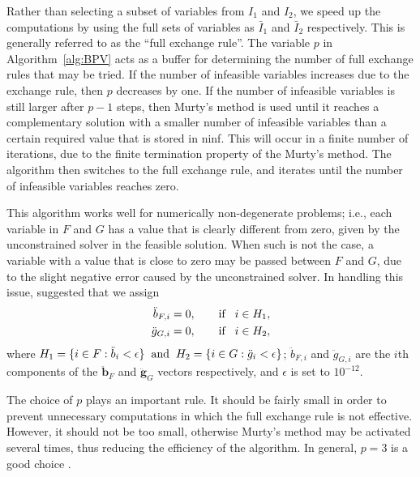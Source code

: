 \documentclass[11pt]{article}
\newcommand{\0}{\phantom{0}}
\begin{document}
Rather than selecting a subset of variables from $I_{1}$ and $I_{2}$, we speed up the computations by using the full sets of variables as $\bar{I}_{1}$ and $\bar{I}_{2}$ respectively. This is generally referred to as the ``full exchange rule''. The variable $p$ in Algorithm~\ref{alg:BPV} acts as a buffer for determining the number of full exchange rules that may be tried. If the number of infeasible variables increases due to the exchange rule, then $p$ decreases by one. If the number of infeasible variables is still larger after $p - 1$ steps, then Murty's method is used until it reaches a complementary solution with a smaller number of infeasible variables than a certain required value that is stored in ninf. This will occur in a finite number of iterations, due to the finite termination property of the Murty's method. The algorithm then switches to the full exchange rule, and iterates until the number of infeasible variables reaches zero.

This algorithm works well for numerically non-degenerate problems; i.e., each variable in $F$ and $G$ has a value that is clearly different from zero, given by the unconstrained solver in the feasible solution. When such is not the case, a variable with a value that is close to zero may be passed between $F$ and $G$, due to the slight negative error caused by the unconstrained solver. In handling this issue, \citet{Cantar2004} suggested that we assign
\begin{align*}
\ddot{b}_{F, i} & = 0, \qquad \text{if} \hspace{3mm} i \in H_{1},\\
\ddot{g}_{G, i} & = 0, \qquad \text{if} \hspace{3mm} i \in H_{2},
\end{align*}
where $H_{1} = \{i \in F: \ddot{b}_{i} < \epsilon\} \hspace{2mm} \text{and} \hspace{2mm} H_{2} = \{i \in G: \ddot{g}_{i} < \epsilon\}$; $\ddot{b}_{F, i}$ and $\ddot{g}_{G, i}$ are the $i$th components of the $\ddot{\bm{b}}_{F}$ and $\ddot{\bm{g}}_{G}$ vectors respectively, and $\epsilon$ is set to $10^{-12}$.

The choice of $p$ plays an important rule. It should be fairly small in order to prevent unnecessary computations in which the full exchange rule is not effective. However, it should not be too small, otherwise Murty's method may be activated several times, thus reducing the efficiency of the algorithm. In general, $p = 3$ is a good choice \citep{Judice1994}.
\end{document}
